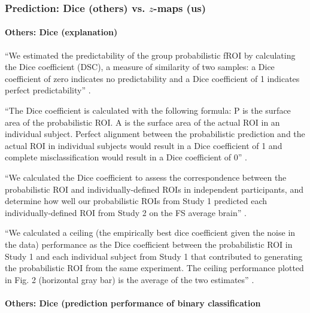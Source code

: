 \subsubsection{Prediction: Dice (others) vs. $z$-maps (us)}





\paragraph{Others: Dice (explanation)}

``We estimated the predictability of the group probabilistic fROI by calculating
the Dice coefficient (DSC), a measure of similarity of two samples:
%
a Dice coefficient of zero indicates no predictability and a Dice coefficient of
1 indicates perfect predictability'' \citep{rosenke2021probabilistic}.

``The Dice coefficient is calculated with the following formula:
%
P is the surface area of the probabilistic ROI.
%
A is the surface area of the actual ROI in an individual subject.
%
Perfect alignment between the probabilistic prediction and the actual ROI in
individual subjects would result in a Dice coefficient of 1 and complete
misclassification would result in a Dice coefficient of 0''
\citep{weiner2018defining}.


``We calculated the Dice coefficient to assess the correspondence between the
probabilistic ROI and individually-defined ROIs in independent participants, and
determine how well our probabilistic ROIs from Study 1 predicted each
individually-defined ROI from Study 2 on the FS average brain''
\citep{weiner2018defining}.

``We calculated a ceiling (the empirically best dice coefficient given the noise
in the data) performance as the Dice coefficient between the probabilistic ROI
in Study 1 and each individual subject from Study 1 that contributed to
generating the probabilistic ROI from the same experiment.
%
The ceiling performance plotted in Fig. 2 (horizontal gray bar) is the average
of the two estimates'' \citep{weiner2018defining}.


\paragraph{Others: Dice (prediction performance of binary classification}




